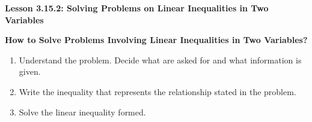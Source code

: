  \begin{center}
\textbf{Lesson 3.15.2: Solving Problems on Linear Inequalities in Two Variables}
\end{center}

\vspace*{1ex}


\textbf{How to Solve Problems Involving Linear Inequalities in Two Variables?}
		 \begin{enumerate}%
			\item Understand the problem. Decide what are asked for and what information is given.
			\item Write the inequality that represents the relationship stated in the problem.
			\item Solve the linear inequality formed.
		\end{enumerate}			
